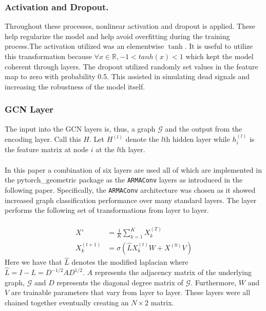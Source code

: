 \subsubsection{Activation and Dropout.}
Throughout these processes, nonlinear activation and dropout is applied. These help regularize the model and help avoid overfitting during the training process.The activation utilized was an elementwise $\tanh$. It is useful to utilize this transformation because $\forall x \in \mathbb{R}, -1 < tanh(x) < 1$ which kept the model coherent through layers. The dropout utilized randomly set values in the feature map to zero with probability 0.5. This assisted in simulating dead signals and increasing the robustness of the model itself.

\subsubsection{GCN Layer}
The input into the GCN layers is, thus, a graph $\mathcal{G}$ and the output from the encoding layer. Call this $H$. Let $H^{(l)}$ denote the $l$th hidden layer while $h_i^{(l)}$ is the feature matrix at node $i$ at the $l$th layer. \\\\
In this paper a combination of six layers are used all of which are implemented in the pytorch\_geometric package as the \verb|ARMAConv| layers as introduced in the following paper. Specifically, the \verb|ARMAConv| architecture was chosen as it showed increased graph classification performance over many standard layers. The layer performs the following set of transformations from layer to layer.\\\\
\begin{align*}
    X' &= \frac{1}{K}\sum_{k=1}^K X_k^{(T)} \\
    X_k^{(t+1)} &= \sigma(\hat{L}X_k^{(t)}W + X^{(0)}V)
\end{align*}
Here we have that $\hat{L}$ denotes the modified laplacian where $\hat{L} = I - L = D^{-1/2}AD^{1/2}$. $A$ represents the adjacency matrix of the underlying graph, $\mathcal{G}$ and $D$ represents the diagonal degree matrix of $\mathcal{G}$. Furthermore, $W$ and $V$ are trainable parameters that vary from layer to layer. These layers were all chained together eventually creating an $N \times 2$ matrix.

